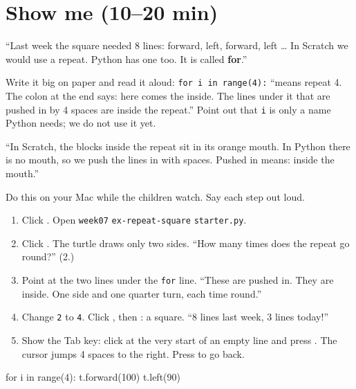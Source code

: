 \section{Show me (10--20 min)}
\begin{teacherscript}
\enquote{Last week the square needed 8 lines: forward, left, forward, left \ldots{} In Scratch we would use a repeat. Python has one too. It is called \textbf{for}.}

Write it big on paper and read it aloud: \texttt{for i in range(4):} \enquote{means repeat 4. The colon at the end says: here comes the inside. The lines under it that are pushed in by 4 spaces are inside the repeat.} Point out that \texttt{i} is only a name Python needs; we do not use it yet.
\end{teacherscript}

\begin{analogy}
\enquote{In Scratch, the blocks inside the repeat sit in its orange mouth. In Python there is no mouth, so we push the lines in with spaces. Pushed in means: inside the mouth.}
\end{analogy}

\begin{workedexample}
Do this on your Mac while the children watch. Say each step out loud.
\begin{enumerate}[leftmargin=1.4em,itemsep=1pt]
  \item Click . Open \texttt{week07} \textrightarrow{} \texttt{ex-repeat-square} \textrightarrow{} \texttt{starter.py}.
  \item Click . The turtle draws only two sides. \enquote{How many times does the repeat go round?} (2.)
  \item Point at the two lines under the \texttt{for} line. \enquote{These are pushed in. They are inside. One side and one quarter turn, each time round.}
  \item Change \texttt{2} to \texttt{4}. Click , then : a square. \enquote{8 lines last week, 3 lines today!}
  \item Show the Tab key: click at the very start of an empty line and press . The cursor jumps 4 spaces to the right. Press  to go back.
\end{enumerate}
\begin{pycode}
for i in range(4):
    t.forward(100)
    t.left(90)
\end{pycode}
\end{workedexample}


